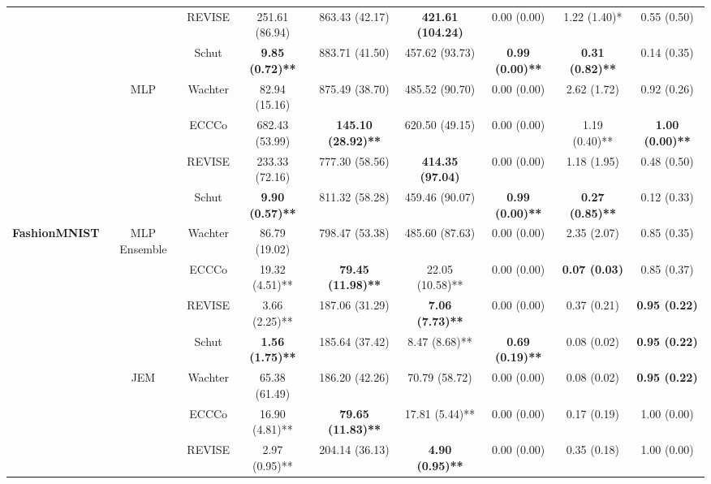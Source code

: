 \begin{table}
{\begin{tabular}[t]{>{}c|c|c|c|c|c|c|c|c}
 &  & REVISE & 251.61 (86.94) & 863.43 (42.17) & \textbf{421.61 (104.24)} & 0.00 (0.00) & 1.22 (1.40)* & 0.55 (0.50)\\

 &  & Schut & \textbf{9.85 (0.72)**} & 883.71 (41.50) & 457.62 (93.73) & \textbf{0.99 (0.00)**} & \textbf{0.31 (0.82)**} & 0.14 (0.35)\\

 & \multirow{-4}{*}{\centering\arraybackslash MLP} & Wachter & 82.94 (15.16) & 875.49 (38.70) & 485.52 (90.70) & 0.00 (0.00) & 2.62 (1.72) & 0.92 (0.26)\\
\cline{2-9}
 &  & ECCCo & 682.43 (53.99) & \textbf{145.10 (28.92)**} & 620.50 (49.15) & 0.00 (0.00) & 1.19 (0.40)** & \textbf{1.00 (0.00)**}\\

 &  & REVISE & 233.33 (72.16) & 777.30 (58.56) & \textbf{414.35 (97.04)} & 0.00 (0.00) & 1.18 (1.95) & 0.48 (0.50)\\

 &  & Schut & \textbf{9.90 (0.57)**} & 811.32 (58.28) & 459.46 (90.07) & \textbf{0.99 (0.00)**} & \textbf{0.27 (0.85)**} & 0.12 (0.33)\\

\multirow{-16}{*}{\centering\arraybackslash \textbf{FashionMNIST}} & \multirow{-4}{*}{\centering\arraybackslash MLP Ensemble} & Wachter & 86.79 (19.02) & 798.47 (53.38) & 485.60 (87.63) & 0.00 (0.00) & 2.35 (2.07) & 0.85 (0.35)\\
\cline{1-9}
 &  & ECCCo & 19.32 (4.51)** & \textbf{79.45 (11.98)**} & 22.05 (10.58)** & 0.00 (0.00) & \textbf{0.07 (0.03)} & 0.85 (0.37)\\

 &  & REVISE & 3.66 (2.25)** & 187.06 (31.29) & \textbf{7.06 (7.73)**} & 0.00 (0.00) & 0.37 (0.21) & \textbf{0.95 (0.22)}\\

 &  & Schut & \textbf{1.56 (1.75)**} & 185.64 (37.42) & 8.47 (8.68)** & \textbf{0.69 (0.19)**} & 0.08 (0.02) & \textbf{0.95 (0.22)}\\

 & \multirow{-4}{*}{\centering\arraybackslash JEM} & Wachter & 65.38 (61.49) & 186.20 (42.26) & 70.79 (58.72) & 0.00 (0.00) & 0.08 (0.02) & \textbf{0.95 (0.22)}\\
\cline{2-9}
 &  & ECCCo & 16.90 (4.81)** & \textbf{79.65 (11.83)**} & 17.81 (5.44)** & 0.00 (0.00) & 0.17 (0.19) & 1.00 (0.00)\\

 &  & REVISE & 2.97 (0.95)** & 204.14 (36.13) & \textbf{4.90 (0.95)**} & 0.00 (0.00) & 0.35 (0.18) & 1.00 (0.00)\\


\end{tabular}}
\end{table}
